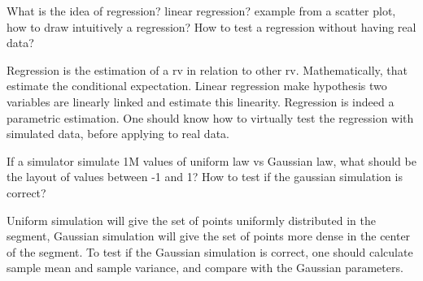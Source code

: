 \documentclass{exam}%
\newcommand*{\ANCOAFINANCE}{}%
\begin{document}
\begin{questions}
\question What is the idea of regression? linear regression? example from a scatter plot, how to draw intuitively a regression? How to test a regression without having real data?
\begin{solution}[.2in]
Regression is the estimation of a rv in relation to other rv. Mathematically, that estimate the conditional expectation. Linear regression make hypothesis two variables are linearly linked and estimate this linearity. Regression is indeed a parametric estimation. One should know how to virtually test the regression with simulated data, before applying to real data.
\end{solution}

\question If a simulator simulate 1M values of uniform law vs Gaussian law, what should be the layout of values between -1 and 1? How to test if the gaussian simulation is correct?
\begin{solution}[.2in]
Uniform simulation will give the set of points uniformly distributed in the segment, Gaussian simulation will give the set of points more dense in the center of the segment. To test if the Gaussian simulation is correct, one should calculate sample mean and sample variance, and compare with the Gaussian parameters.
\end{solution}
\end{questions}
\fi
\ifdefined\ANCOAFINANCE
\newpage
\end{document}
